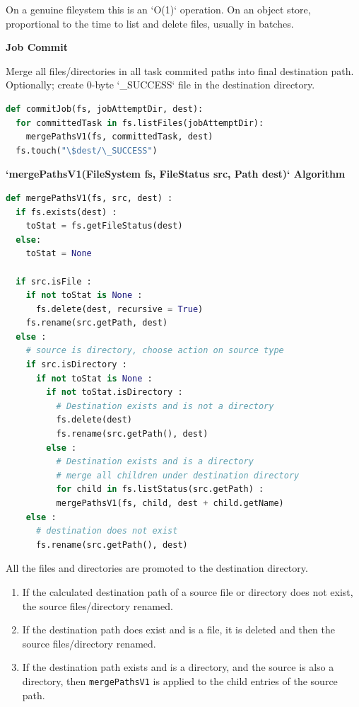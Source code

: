 \documentclass[conference]{IEEEtran}
\begin{document}
On a genuine fileystem this is an `O(1)` operation.
On an object store,
proportional to the time to list and delete files, usually in batches.


\textbf{Job Commit}

Merge all files/directories in all task commited paths into final destination path.
Optionally;
create 0-byte `\_SUCCESS` file in the destination directory.

\begin{lstlisting}[language=Python]
def commitJob(fs, jobAttemptDir, dest):
  for committedTask in fs.listFiles(jobAttemptDir):
    mergePathsV1(fs, committedTask, dest)
  fs.touch("\$dest/\_SUCCESS")
\end{lstlisting}

\textbf{`mergePathsV1(FileSystem fs, FileStatus src, Path dest)` Algorithm}

\begin{lstlisting}[language=Python]
def mergePathsV1(fs, src, dest) :
  if fs.exists(dest) :
    toStat = fs.getFileStatus(dest)
  else:
    toStat = None

  if src.isFile :
    if not toStat is None :
      fs.delete(dest, recursive = True)
    fs.rename(src.getPath, dest)
  else :
    # source is directory, choose action on source type
    if src.isDirectory :
      if not toStat is None :
        if not toStat.isDirectory :
          # Destination exists and is not a directory
          fs.delete(dest)
          fs.rename(src.getPath(), dest)
        else :
          # Destination exists and is a directory
          # merge all children under destination directory
          for child in fs.listStatus(src.getPath) :
          mergePathsV1(fs, child, dest + child.getName)
    else :
      # destination does not exist
      fs.rename(src.getPath(), dest)
\end{lstlisting}


All the files and directories are promoted to the destination directory.
\begin{enumerate}
  \item If the calculated destination path of a source file or directory does
  not exist, the source files/directory renamed.
  \item If the destination path does exist and is a file, it is deleted and then
  the source files/directory renamed.
  \item If the destination path exists and is a directory, and the source
  is also a directory, then \texttt{mergePathsV1} is applied to the child
  entries of the source path.
\end{enumerate}
\end{document}
